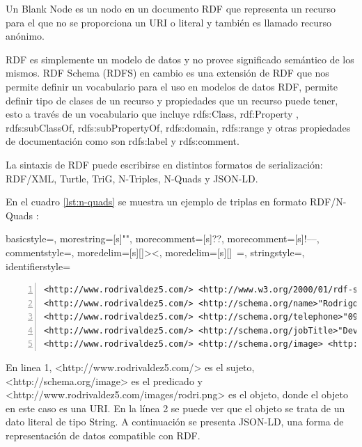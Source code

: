Un Blank Node es un nodo en un documento RDF que representa un recurso para el que no se proporciona un URI o literal y también es llamado recurso anónimo.

RDF es simplemente un modelo de datos y no provee significado semántico de los mismos. RDF Schema (RDFS) en cambio es una extensión de RDF que nos permite definir un vocabulario para el uso en modelos de datos RDF, permite definir tipo de clases de un recurso y propiedades que un recurso puede tener, esto a través de un vocabulario que incluye rdfs:Class, rdf:Property , rdfs:subClassOf, rdfs:subPropertyOf, rdfs:domain, rdfs:range y otras propiedades de documentación como son rdfs:label y rdfs:comment.

La sintaxis de RDF puede escribirse en distintos formatos de serialización: RDF/XML, Turtle, TriG, N-Triples, N-Quads y JSON-LD.

En el cuadro \ref{lst:n-quads} se muestra un ejemplo de triplas en formato RDF/N-Quads :

{
  basicstyle=\ttfamily,
  morestring=[s]{"}{"},
  morecomment=[s]{?}{?},
  morecomment=[s]{!--}{--},
  commentstyle=\color{darkgreen},
  moredelim=[s][\color{black}]{>}{<},
  moredelim=[s][\color{red}]{\ }{=},
  stringstyle=\color{blue},
  identifierstyle=\color{maroon}
}
\footnotesize
\begin{lstlisting}[captionpos=b, caption=Ejemplo en RDF/N-Quads, label=lst:n-quads,  numbers=left,  numberstyle=\tiny\color{mygray},
    basicstyle=\tiny,frame=single]
<http://www.rodrivaldez5.com/> <http://www.w3.org/2000/01/rdf-schema#type> <http://schema.org/person> .  
<http://www.rodrivaldez5.com/> <http://schema.org/name>"Rodrigo Valdez" .
<http://www.rodrivaldez5.com/> <http://schema.org/telephone>"0981530572" .
<http://www.rodrivaldez5.com/> <http://schema.org/jobTitle>"Developer" .
<http://www.rodrivaldez5.com/> <http://schema.org/image> <http://www.rodrivaldez5.com/images/rodri.png> .
\end{lstlisting}


En linea 1, <http://www.rodrivaldez5.com/> es el sujeto, <http://schema.org/image> es el predicado y <http://www.rodrivaldez5.com/images/rodri.png> es el objeto, donde el objeto en este caso es una URI. En la línea 2 se puede ver que el objeto se trata de un dato literal de tipo String.  A continuación se presenta JSON-LD, una forma de representación de datos compatible con RDF.

